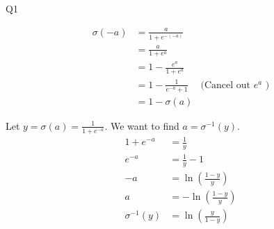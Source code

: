 \question Q1\droppoints

\begin{solution}

    \[
        \begin{align*}
            \sigma(-a)
            &= \frac{a}{1 + e^{-(-a)}} & \\
            &= \frac{a}{1 + e^a} & \\
            &= 1 - \frac{e^a}{1 + e^a} & \\
            &= 1 - \frac{1}{e^{-a} + 1} & \text{(Cancel out } e^a \text{ )} \\
            &= 1 - \sigma(a)
        \end{align*}
    \]

     Let $y = \sigma(a) = \frac{1}{1 + e^{-a}}$.
    We want to find $a = \sigma^{-1}(y)$.
    \[
        \begin{align*}
            1 + e^{-a} &= \frac{1}{y} \\
            e^{-a} &= \frac{1}{y} - 1 \\
            -a &= \ln{\left(\frac{1 - y}{y}\right)} \\
            a &= -\ln{\left(\frac{1 - y}{y}\right)} \\
            \sigma^{-1}(y) &= \ln{\left(\frac{y}{1 - y}\right)}
        \end{align*}
    \]
\end{solution}
